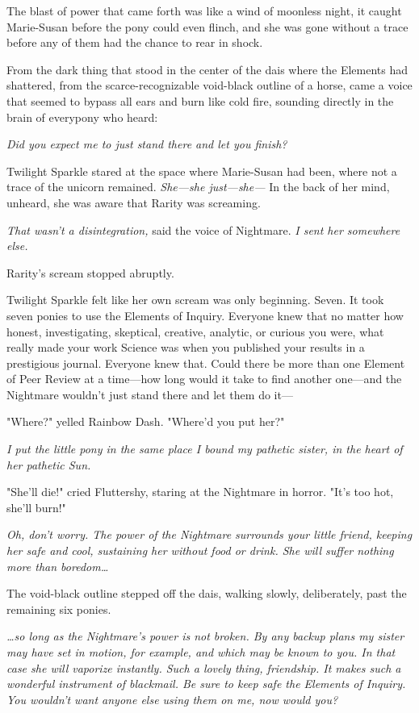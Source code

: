 The blast of power that came forth was like a wind of moonless night, it caught 
Marie-Susan before the pony could even flinch, and she was gone without a trace 
before any of them had the chance to rear in shock.

From the dark thing that stood in the center of the dais where the Elements had 
shattered, from the scarce-recognizable void-black outline of a horse, came a 
voice that seemed to bypass all ears and burn like cold fire, sounding directly 
in the brain of everypony who heard:

\emph{Did you expect me to just stand there and let you finish?}

Twilight Sparkle stared at the space where Marie-Susan had been, where not a 
trace of the unicorn remained. \emph{She---she just---she---} In the back of 
her mind, unheard, she was aware that Rarity was screaming.

\emph{That wasn't a disintegration,} said the voice of Nightmare. \emph{I sent 
her somewhere else.}

Rarity's scream stopped abruptly.

Twilight Sparkle felt like her own scream was only beginning. Seven. It took 
seven ponies to use the Elements of Inquiry. Everyone knew that no matter how 
honest, investigating, skeptical, creative, analytic, or curious you were, what 
really made your work Science was when you published your results in a 
prestigious journal. Everyone knew that. Could there be more than one Element 
of Peer Review at a time---how long would it take to find another one---and the 
Nightmare wouldn't just stand there and let them do it---

"Where?" yelled Rainbow Dash. "Where'd you put her?"

\emph{I put the little pony in the same place I bound my pathetic sister, in 
the heart of her pathetic Sun.}

"She'll die!" cried Fluttershy, staring at the Nightmare in horror. "It's too 
hot, she'll burn!"

\emph{Oh, don't worry. The power of the Nightmare surrounds your little friend, 
keeping her safe and cool, sustaining her without food or drink. She will 
suffer nothing more than boredom{\ldots}}

The void-black outline stepped off the dais, walking slowly, deliberately, past 
the remaining six ponies.

\emph{{\ldots}so long as the Nightmare's power is not broken. By any backup 
plans my sister may have set in motion, for example, and which may be known to 
you. In that case she will vaporize instantly. Such a lovely thing, friendship. 
It makes such a wonderful instrument of blackmail. Be sure to keep safe the 
Elements of Inquiry. You wouldn't want anyone else using them on me, now would 
you?}


